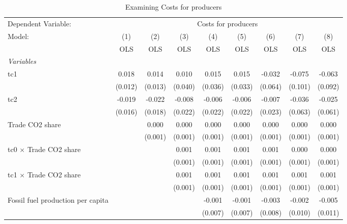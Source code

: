 
\begin{table}[htbp]
   \caption{Examining Costs for producers}
   \centering
   \begin{tabular}{lcccccccc}
      \toprule
      Dependent Variable: & \multicolumn{8}{c}{Costs for producers}\\
      Model:                                  & (1)     & (2)     & (3)     & (4)     & (5)     & (6)     & (7)     & (8)\\  
                                              &  OLS    & OLS     & OLS     & OLS     & OLS     & OLS     & OLS     & OLS\\  
      \midrule
      \emph{Variables}\\
      tc1                                     & 0.018   & 0.014   & 0.010   & 0.015   & 0.015   & -0.032  & -0.075  & -0.063\\   
                                              & (0.012) & (0.013) & (0.040) & (0.036) & (0.033) & (0.064) & (0.101) & (0.092)\\   
      tc2                                     & -0.019  & -0.022  & -0.008  & -0.006  & -0.006  & -0.007  & -0.036  & -0.025\\   
                                              & (0.016) & (0.018) & (0.022) & (0.022) & (0.022) & (0.023) & (0.063) & (0.061)\\   
      Trade CO2 share                         &         & 0.000   & 0.000   & 0.000   & 0.000   & 0.000   & 0.000   & 0.000\\   
                                              &         & (0.001) & (0.001) & (0.001) & (0.001) & (0.001) & (0.001) & (0.001)\\   
      tc0 $\times$ Trade CO2 share            &         &         & 0.001   & 0.001   & 0.001   & 0.001   & 0.000   & 0.000\\   
                                              &         &         & (0.001) & (0.001) & (0.001) & (0.001) & (0.001) & (0.001)\\   
      tc1 $\times$ Trade CO2 share            &         &         & 0.001   & 0.001   & 0.001   & 0.001   & 0.001   & 0.001\\   
                                              &         &         & (0.001) & (0.001) & (0.001) & (0.001) & (0.001) & (0.001)\\   
      Fossil fuel production per capita       &         &         &         & -0.001  & -0.001  & -0.003  & -0.002  & -0.005\\   
                                              &         &         &         & (0.007) & (0.007) & (0.008) & (0.010) & (0.011)\\   

\end{tabular}
\end{table}
